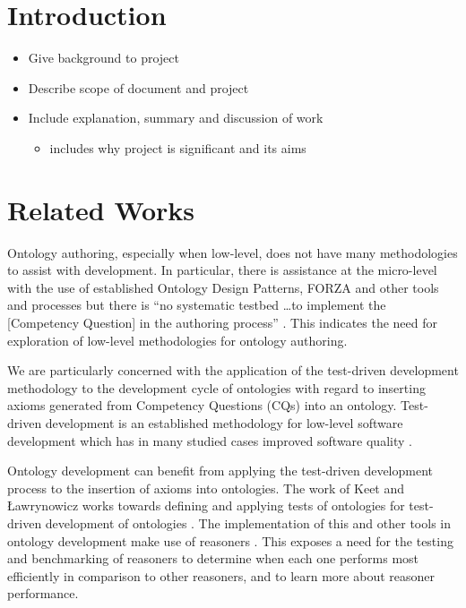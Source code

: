 \documentclass[draft]{sig-alternate-05-2015}
\newcommand{\todo}[1][]{\ifdraft{\ifthenelse{\isempty{#1}}{\hl{(TODO)}}{\hl{(TODO: #1)}}}{}}
\begin{document}
\printccsdesc


\section{Introduction}
\todo
\begin{itemize}
  \item Give background to project
  \item Describe scope of document and project
  \item Include explanation, summary and discussion of work
  \begin{itemize}
    \item includes why project is significant and its aims
  \end{itemize}
\end{itemize}

\section{Related Works}

Ontology authoring, especially when low-level, does not have many methodologies to assist with development. In particular, there is assistance at the micro-level with the use of established Ontology Design Patterns, FORZA and other tools and processes but there is ``no systematic testbed \ldots to implement the [Competency Question] in the authoring process'' \cite{DBLP:journals/corr/KeetL15}. This indicates the need for exploration of low-level methodologies for ontology authoring.

We are particularly concerned with the application of the test-driven development methodology to the development cycle of ontologies with regard to inserting axioms generated from Competency Questions (CQs) into an ontology. Test-driven development is an established methodology for low-level software development which has in many studied cases improved software quality \cite{DBLP:journals/infsof/BissiNE16}. 

Ontology development can benefit from applying the test-driven development process to the insertion of axioms into ontologies. The work of Keet and \L{}awrynowicz works towards defining and applying tests of ontologies for test-driven development of ontologies \cite{DBLP:journals/corr/KeetL15,DBLP:conf/esws/KeetL16}. The implementation of this \cite{DBLP:conf/dlog/LawrynowiczK16} and other tools in ontology development make use of reasoners \cite{DBLP:journals/corr/KeetL15}. This exposes a need for the testing and benchmarking of reasoners to determine when each one performs most efficiently in comparison to other reasoners, and to learn more about reasoner performance.
\end{document}
